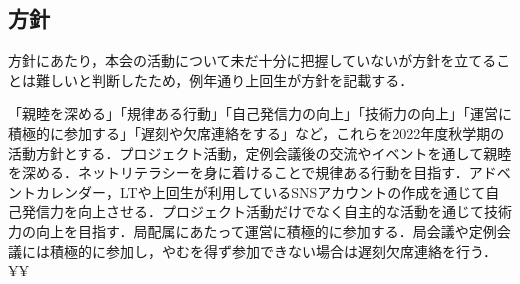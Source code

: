 \subsection*{\firstGrade{}方針}


\firstGrade{}方針にあたり，本会の活動について未だ十分に把握していない\firstGrade{}が方針を立てることは難しいと判断したため，例年通り上回生が\firstGrade{}方針を記載する．
\par
「親睦を深める」「規律ある行動」「自己発信力の向上」「技術力の向上」「運営に積極的に参加する」「遅刻や欠席連絡をする」など，これらを\firstGrade{}2022年度秋学期の活動方針とする．プロジェクト活動，定例会議後の交流やイベントを通して親睦を深める．ネットリテラシーを身に着けることで規律ある行動を目指す．アドベントカレンダー，LTや上回生が利用しているSNSアカウントの作成を通じて自己発信力を向上させる．プロジェクト活動だけでなく自主的な活動を通じて技術力の向上を目指す．局配属にあたって運営に積極的に参加する．局会議や定例会議には積極的に参加し，やむを得ず参加できない場合は遅刻欠席連絡を行う．
¥¥